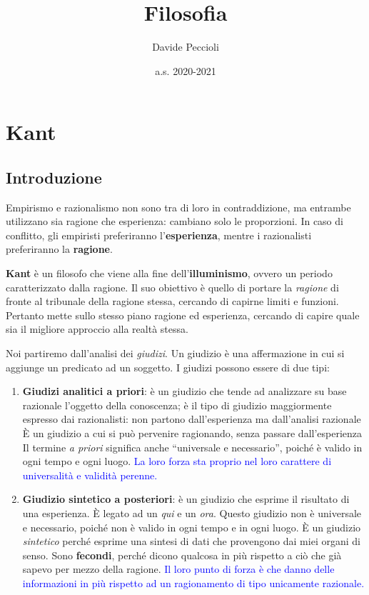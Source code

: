 \documentclass[a4paper, twoside, titlepage]{book}
\title{Filosofia}
\author{Davide Peccioli}
\date{a.s. 2020-2021}
\renewcommand{\emph}[1]{\textcolor{blue}{#1}}
\begin{document}
\maketitle

\tableofcontents

\part{Kant}

\chapter*{Introduzione}

Empirismo e razionalismo non sono tra di loro in contraddizione, ma entrambe utilizzano sia ragione che esperienza: cambiano solo le proporzioni. In caso di conflitto, gli empiristi preferiranno l’\textbf{esperienza}, mentre i razionalisti preferiranno la \textbf{ragione}.

\textbf{Kant} è un filosofo che viene alla fine dell’\textbf{illuminismo}, ovvero un periodo caratterizzato dalla ragione. Il suo obiettivo è quello di portare la \textit{ragione} di fronte al tribunale della ragione stessa, cercando di capirne limiti e funzioni.
Pertanto mette sullo stesso piano ragione ed esperienza, cercando di capire quale sia il migliore approccio alla realtà stessa.

Noi partiremo dall’analisi dei \textit{giudizi}. Un giudizio è una affermazione in cui si aggiunge un predicato ad un soggetto.
I giudizi possono essere di due tipi:
\begin{enumerate}
\item \textbf{Giudizi analitici a priori}: è un giudizio che tende ad analizzare su base razionale l’oggetto della conoscenza; è il tipo di giudizio maggiormente espresso dai razionalisti: non partono dall’esperienza ma dall’analisi razionale
È un giudizio a cui si può pervenire ragionando, senza passare dall’esperienza
Il termine \textit{a priori} significa anche “universale e necessario”, poiché è valido in ogni tempo e ogni luogo.
\emph{La loro forza sta proprio nel loro carattere di universalità e validità perenne.}
\item \textbf{Giudizio sintetico a posteriori}: è un giudizio che esprime il risultato di una esperienza.  È legato ad un \textit{qui} e un \textit{ora}. Questo giudizio non è universale e necessario, poiché non è valido in ogni tempo e in ogni luogo. È un giudizio \textit{sintetico} perché esprime una sintesi di dati che provengono dai miei organi di senso. 
Sono \textbf{fecondi}, perché dicono qualcosa in più rispetto a ciò che già sapevo per mezzo della ragione.
\emph{Il loro punto di forza è che danno delle informazioni in più rispetto ad un ragionamento di tipo unicamente razionale.}
\end{enumerate}
\end{document}

